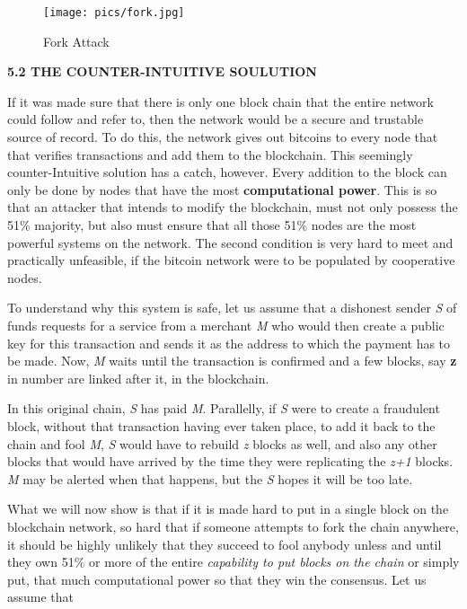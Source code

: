 \documentclass[12pt,a4paper]{report}
\begin{document}
\begin{flushleft}
\vspace{10mm}
\begin{figure}[h]
\centering
\caption{Fork Attack}
\texttt{[image: pics/fork.jpg]}
\end{figure}


\vspace{10mm}
\vspace{10mm}
\textbf{5.2 THE COUNTER-INTUITIVE SOULUTION}
\vspace{10mm}

If it was made sure that there is only one block chain that the entire network could follow and refer to, then the network would be a secure and trustable source of record. To do this, the network gives out bitcoins to every node that that verifies transactions and add them to the blockchain. \newline
This seemingly counter-Intuitive solution has a catch, however. Every addition to the block can only be done by nodes that have the most \textbf{computational power}. This is so that an attacker that intends to modify the blockchain, must not only possess the 51\% majority, but also must ensure that all those 51\% nodes are the most powerful systems on the network. The second condition is very hard to meet and practically unfeasible, if the bitcoin network were to be populated by cooperative nodes. \newline

\vspace{10mm}
To understand why this system is safe, let us assume that a dishonest sender \textit{S} of funds requests for a service from a merchant \textit{M} who would then create a public key for this transaction and sends it as the address to which the payment has to be made. Now, \textit{M} waits until the transaction is confirmed and a few blocks, say \textbf{z} in number are linked after it, in the blockchain.\newline

In this original chain, \textit{S} has paid \textit{M}. Parallelly, if \textit{S} were to create a fraudulent block, without that transaction having ever taken place, to add it back to the chain and fool \textit{M}, \textit{S} would have to rebuild \textit{z} blocks as well, and also any other blocks that would have arrived by the time they were replicating the \textit{z+1} blocks. \textit{M} may be alerted when that happens, but the \textit{S} hopes it will be too late.\newline

What we will now show is that if it is made hard to put in a single block on the blockchain network, so hard that if someone attempts to fork the chain anywhere, it should be highly unlikely that they succeed to fool anybody unless and until they own 51\% or more of the entire \textit{capability to put blocks on the chain} or simply put, that much computational power so that they win the consensus. Let us assume that\newline


\end{flushleft}
\end{document}
